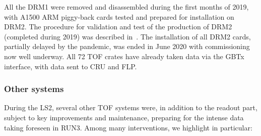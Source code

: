 All the DRM1 were removed and disassembled during the first months of 2019, with A1500 ARM piggy-back cards tested and prepared for installation on DRM2. The procedure for validation and test of the production of DRM2 (completed during 2019) was described in~\cite{Falchieri:2019mpp}. The installation of all DRM2 cards, partially delayed by the pandemic, was ended in June 2020 with commissioning now well underway. All 72 TOF crates have already taken data via the GBTx interface, with data sent to CRU and FLP. 


\subsubsection{Other systems}
During the LS2, several other TOF systems were, in addition to the readout part, subject to key improvements and maintenance, preparing for the intense data taking foreseen in RUN3. Among many interventions, we highlight in particular:
